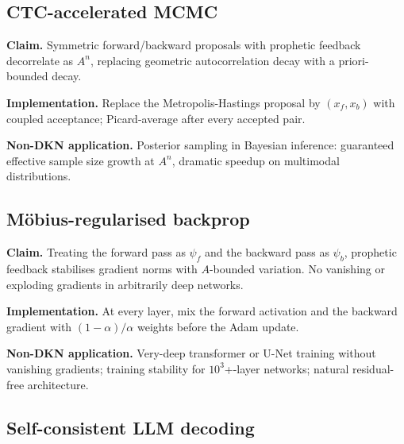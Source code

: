 \documentclass[11pt,a4paper]{article}
\theoremstyle{definition}
\newcommand{\psif}{\psi_{f}}
\newcommand{\psib}{\psi_{b}}
\newcommand{\contr}{A}
\begin{document}
\subsection{CTC-accelerated MCMC}\label{nov:24}

\begin{tcolorbox}[noveltybox]
\textbf{Claim.} Symmetric forward/backward proposals with prophetic
feedback decorrelate as $\contr^n$, replacing geometric autocorrelation
decay with a priori-bounded decay.
\end{tcolorbox}

\textbf{Implementation.} Replace the Metropolis-Hastings proposal by
$(x_f, x_b)$ with coupled acceptance; Picard-average after every
accepted pair.

\begin{tcolorbox}[applbox]
\textbf{Non-DKN application.}
Posterior sampling in Bayesian inference: guaranteed effective
sample size growth at $\contr^n$, dramatic speedup on multimodal
distributions.
\end{tcolorbox}

\subsection{M\"obius-regularised backprop}\label{nov:25}

\begin{tcolorbox}[noveltybox]
\textbf{Claim.} Treating the forward pass as $\psif$ and the backward
pass as $\psib$, prophetic feedback stabilises gradient norms with
$\contr$-bounded variation. No vanishing or exploding gradients in
arbitrarily deep networks.
\end{tcolorbox}

\textbf{Implementation.} At every layer, mix the forward activation
and the backward gradient with $(1-\alpha)/\alpha$ weights before the
Adam update.

\begin{tcolorbox}[applbox]
\textbf{Non-DKN application.}
Very-deep transformer or U-Net training without vanishing gradients;
training stability for $10^3$+-layer networks; natural residual-free
architecture.
\end{tcolorbox}

\subsection{Self-consistent LLM decoding}\label{nov:26}
\end{document}
